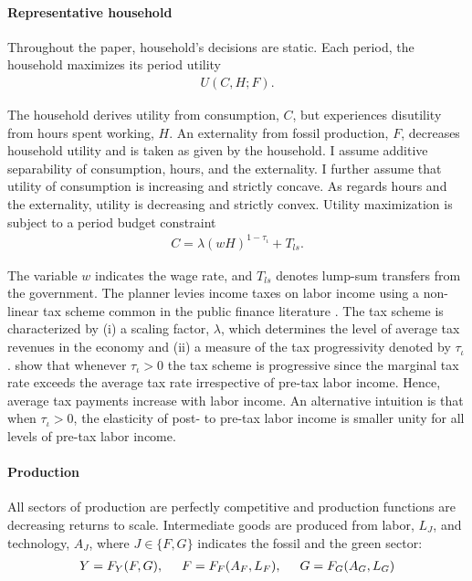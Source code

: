 \paragraph{Representative household}
Throughout the paper, household's decisions are static. Each period, the household maximizes its period utility
\begin{align}
U(C,H; F).
\end{align} 

The household derives utility from consumption, $C$, but experiences disutility from hours spent working, $H$. An externality from fossil production, $F$, decreases household utility and is taken as given by the household.
I assume additive separability of consumption, hours, and the externality. I further assume that utility of consumption is increasing and strictly concave. As regards hours and the externality, utility is decreasing and strictly convex.
Utility maximization is subject to a period budget constraint
\begin{align}
	 C= \lambda(wH)^{1-\tau_{\iota}}+T_{ls}. \label{eq:hhbudget}
\end{align}

The variable $w$ indicates the wage rate, and $T_{ls}$ denotes lump-sum transfers from the government.
The planner levies income taxes on labor income using a non-linear tax scheme common in the public finance literature \citep{Heathcote2017OptimalFramework, Benabou2002TaxEfficiency}. The tax scheme is
characterized by (i) a scaling factor, $\lambda$, which determines the level of average tax revenues in the economy and (ii) a measure of the tax progressivity denoted by $\tau_{\iota}$. 
\cite{Heathcote2017OptimalFramework} show that whenever $\tau_{\iota}>0$ the tax scheme is progressive since the marginal tax rate exceeds the average tax rate irrespective of  pre-tax labor income. Hence, average tax payments increase with labor income. An alternative intuition is that when $\tau_{\iota}>0$, the elasticity of post- to pre-tax labor income is smaller unity for all levels of pre-tax labor income.  %

\paragraph{Production}
All sectors of production are perfectly competitive and production functions are decreasing returns to scale. %
Intermediate goods are produced from labor, $L_J$, and technology, $A_J$, where $J\in \{F,G\}$ indicates the fossil and the green sector: 
\begin{align}
Y=F_Y(F, G), \hspace{5mm} F=F_F(A_F, L_F),\hspace{5mm} G=F_G(A_G, L_G) \label{eq:prod}
\end{align}

